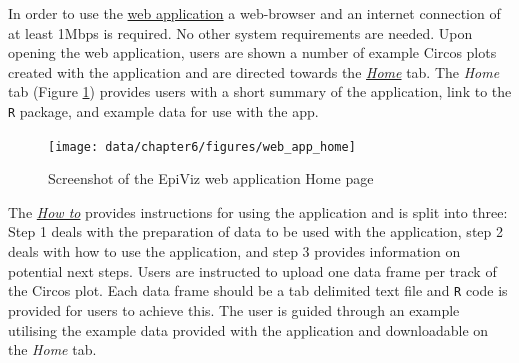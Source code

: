 \documentclass[11pt,twoside]{bristolthesis}
\begin{document}
In order to use the \href{http://mrcieu.mrsoftware.org/EpiViz/}{web application} a web-browser and an internet connection of at least 1Mbps is required. No other system requirements are needed. Upon opening the web application, users are shown a number of example Circos plots created with the application and are directed towards the \href{}{\emph{Home}} tab. The \emph{Home} tab (Figure \ref{fig:web-app-home}) provides users with a short summary of the application, link to the \texttt{R} package, and example data for use with the app.
\begin{figure}
\texttt{[image: data/chapter6/figures/web\_app\_home]} \caption{Screenshot of the EpiViz web application Home page}\label{fig:web-app-home}
\end{figure}
The \href{}{\emph{How to}} provides instructions for using the application and is split into three: Step 1 deals with the preparation of data to be used with the application, step 2 deals with how to use the application, and step 3 provides information on potential next steps. Users are instructed to upload one data frame per track of the Circos plot. Each data frame should be a tab delimited text file and \texttt{R} code is provided for users to achieve this. The user is guided through an example utilising the example data provided with the application and downloadable on the \emph{Home} tab.
\end{document}
